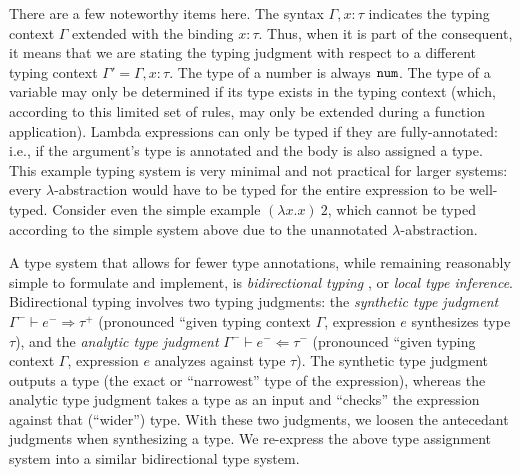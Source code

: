 There are a few noteworthy items here. The syntax $\Gamma,x:\tau$ indicates the typing context $\Gamma$ extended with the binding $x:\tau$. Thus, when it is part of the consequent, it means that we are stating the typing judgment with respect to a different typing context $\Gamma'=\Gamma,x:\tau$. The type of a number is always $\mathtt{num}$. The type of a variable may only be determined if its type exists in the typing context (which, according to this limited set of rules, may only be extended during a function application). Lambda expressions can only be typed if they are fully-annotated: i.e., if the argument's type is annotated and the body is also assigned a type. This example typing system is very minimal and not practical for larger systems: every $\lambda$-abstraction would have to be typed for the entire expression to be well-typed. Consider even the simple example $(\lambda x.x)\ 2$, which cannot be typed according to the simple system above due to the unannotated $\lambda$-abstraction.

A type system that allows for fewer type annotations, while remaining reasonably simple to formulate and implement, is \textit{bidirectional typing} \cite{Dunfield_2022,chlipala2005strict,pierce2000local}, or \textit{local type inference}. Bidirectional typing involves two typing judgments: the \textit{synthetic type judgment} $\Gamma^-\vdash e^-\Rightarrow\tau^+$ (pronounced ``given typing context $\Gamma$, expression $e$ synthesizes type $\tau$), and the \textit{analytic type judgment} $\Gamma^-\vdash e^-\Leftarrow\tau^-$ (pronounced ``given typing context $\Gamma$, expression $e$ analyzes against type $\tau$). The synthetic type judgment outputs a type (the exact or ``narrowest'' type of the expression), whereas the analytic type judgment takes a type as an input and ``checks'' the expression against that (``wider'') type. With these two judgments, we loosen the antecedant judgments when synthesizing a type. We re-express the above type assignment system into a similar bidirectional type system.

\begin{singlespace}
\end{singlespace}

